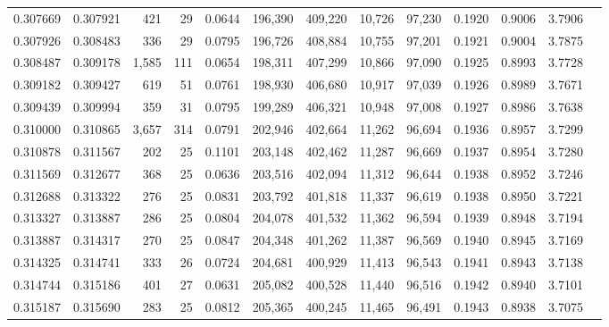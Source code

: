 \begin{tabular}{rrrrrrrrrrrrr}
0.307669 & 0.307921 &   421 &  29 &                                     0.0644 & 196,390 & 409,220 &  10,726 &  97,230 & 0.1920 & 0.9006 & 3.7906 \\
0.307926 & 0.308483 &   336 &  29 &                                     0.0795 & 196,726 & 408,884 &  10,755 &  97,201 & 0.1921 & 0.9004 & 3.7875 \\
0.308487 & 0.309178 & 1,585 & 111 &                                     0.0654 & 198,311 & 407,299 &  10,866 &  97,090 & 0.1925 & 0.8993 & 3.7728 \\
0.309182 & 0.309427 &   619 &  51 &                                     0.0761 & 198,930 & 406,680 &  10,917 &  97,039 & 0.1926 & 0.8989 & 3.7671 \\
0.309439 & 0.309994 &   359 &  31 &                                     0.0795 & 199,289 & 406,321 &  10,948 &  97,008 & 0.1927 & 0.8986 & 3.7638 \\
0.310000 & 0.310865 & 3,657 & 314 &                                     0.0791 & 202,946 & 402,664 &  11,262 &  96,694 & 0.1936 & 0.8957 & 3.7299 \\
0.310878 & 0.311567 &   202 &  25 &                                     0.1101 & 203,148 & 402,462 &  11,287 &  96,669 & 0.1937 & 0.8954 & 3.7280 \\
0.311569 & 0.312677 &   368 &  25 &                                     0.0636 & 203,516 & 402,094 &  11,312 &  96,644 & 0.1938 & 0.8952 & 3.7246 \\
0.312688 & 0.313322 &   276 &  25 &                                     0.0831 & 203,792 & 401,818 &  11,337 &  96,619 & 0.1938 & 0.8950 & 3.7221 \\
0.313327 & 0.313887 &   286 &  25 &                                     0.0804 & 204,078 & 401,532 &  11,362 &  96,594 & 0.1939 & 0.8948 & 3.7194 \\
0.313887 & 0.314317 &   270 &  25 &                                     0.0847 & 204,348 & 401,262 &  11,387 &  96,569 & 0.1940 & 0.8945 & 3.7169 \\
0.314325 & 0.314741 &   333 &  26 &                                     0.0724 & 204,681 & 400,929 &  11,413 &  96,543 & 0.1941 & 0.8943 & 3.7138 \\
0.314744 & 0.315186 &   401 &  27 &                                     0.0631 & 205,082 & 400,528 &  11,440 &  96,516 & 0.1942 & 0.8940 & 3.7101 \\
0.315187 & 0.315690 &   283 &  25 &                                     0.0812 & 205,365 & 400,245 &  11,465 &  96,491 & 0.1943 & 0.8938 & 3.7075 \\

\end{tabular}
